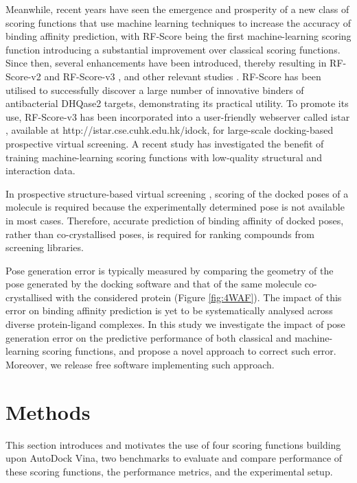\documentclass[twocolumn]{bmcart}
\begin{document}
Meanwhile, recent years have seen the emergence and prosperity of a new class of scoring functions that use machine learning techniques to increase the accuracy of binding affinity prediction, with RF-Score \cite{564} being the first machine-learning scoring function introducing a substantial improvement over classical scoring functions. Since then, several enhancements have been introduced, thereby resulting in RF-Score-v2 \cite{1370} and RF-Score-v3 \cite{1647}, and other relevant studies \cite{1432}. RF-Score has been utilised \cite{1281} to successfully discover a large number of innovative binders of antibacterial DHQase2 targets, demonstrating its practical utility. To promote its use, RF-Score-v3 has been incorporated into a user-friendly webserver called istar \cite{1362}, available at http://istar.cse.cuhk.edu.hk/idock, for large-scale docking-based prospective virtual screening. A recent study \cite{1663} has investigated the benefit of training machine-learning scoring functions with low-quality structural and interaction data.

In prospective structure-based virtual screening \cite{1362}, scoring of the docked poses of a molecule is required because the experimentally determined pose is not available in most cases. Therefore, accurate prediction of binding affinity of docked poses, rather than co-crystallised poses, is required for ranking compounds from screening libraries.

Pose generation error is typically measured by comparing the geometry of the pose generated by the docking software and that of the same molecule co-crystallised with the considered protein (Figure \ref{fig:4WAF}). The impact of this error on binding affinity prediction is yet to be systematically analysed across diverse protein-ligand complexes. In this study we investigate the impact of pose generation error on the predictive performance of both classical and machine-learning scoring functions, and propose a novel approach to correct such error. Moreover, we release free software implementing such approach.

\section*{Methods}

This section introduces and motivates the use of four scoring functions building upon AutoDock Vina, two benchmarks to evaluate and compare performance of these scoring functions, the performance metrics, and the experimental setup.
\end{document}
